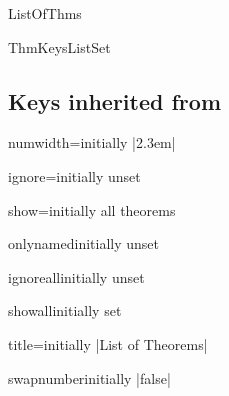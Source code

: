 \documentclass{ltxdoc}
\begin{document}
\begin{docCommand}{ListOfThms}{}

\end{docCommand}

\begin{docCommand}{ThmKeysListSet}{}

\end{docCommand}

\subsection{Keys inherited from }

\begin{docKey}{numwidth}{=}{initially |2.3em|}

\end{docKey}

\begin{docKey}{ignore}{=}{initially unset}

\end{docKey}

\begin{docKey}{show}{=}{initially all theorems}

\end{docKey}

\begin{docKey}{onlynamed}{}{initially unset}

\end{docKey}

\begin{docKey}{ignoreall}{}{initially unset}

\end{docKey}

\begin{docKey}{showall}{}{initially set}

\end{docKey}

\begin{docKey}{title}{=}{initially |List of Theorems|}

\end{docKey}

\begin{docKey}{swapnumber}{}{initially |false|}

\end{docKey}
\end{document}
